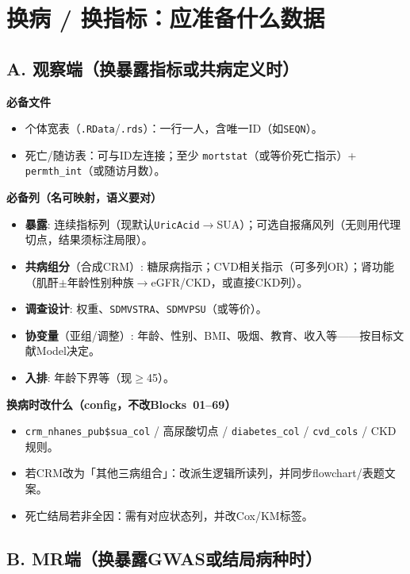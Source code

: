 \documentclass[11pt,a4paper]{article}
\begin{document}
\section{换病 / 换指标：应准备什么数据}

\subsection{A. 观察端（换暴露指标或共病定义时）}

\textbf{必备文件}
\begin{itemize}
  \item 个体宽表（\texttt{.RData}/\texttt{.rds}）：一行一人，含唯一ID（如\texttt{SEQN}）。
  \item 死亡/随访表：可与ID左连接；至少 \texttt{mortstat}（或等价死亡指示）+ \texttt{permth\_int}（或随访月数）。
\end{itemize}

\textbf{必备列（名可映射，语义要对）}
\begin{itemize}
  \item \textbf{暴露}: 连续指标列（现默认\texttt{UricAcid}$\rightarrow$SUA）；可选自报痛风列（无则用代理切点，结果须标注局限）。
  \item \textbf{共病组分}（合成CRM）: 糖尿病指示；CVD相关指示（可多列OR）；肾功能（肌酐$\pm$年龄性别种族$\rightarrow$eGFR/CKD，或直接CKD列）。
  \item \textbf{调查设计}: 权重、\texttt{SDMVSTRA}、\texttt{SDMVPSU}（或等价）。
  \item \textbf{协变量}（亚组/调整）: 年龄、性别、BMI、吸烟、教育、收入等——按目标文献Model决定。
  \item \textbf{入排}: 年龄下界等（现$\geq$45）。
\end{itemize}

\textbf{换病时改什么（config，不改Blocks~01--69）}
\begin{itemize}
  \item \texttt{crm\_nhanes\_pub\$sua\_col} / 高尿酸切点 / \texttt{diabetes\_col} / \texttt{cvd\_cols} / CKD规则。
  \item 若CRM改为「其他三病组合」：改派生逻辑所读列，并同步flowchart/表题文案。
  \item 死亡结局若非全因：需有对应状态列，并改Cox/KM标签。
\end{itemize}

\subsection{B. MR端（换暴露GWAS或结局病种时）}
\end{document}
